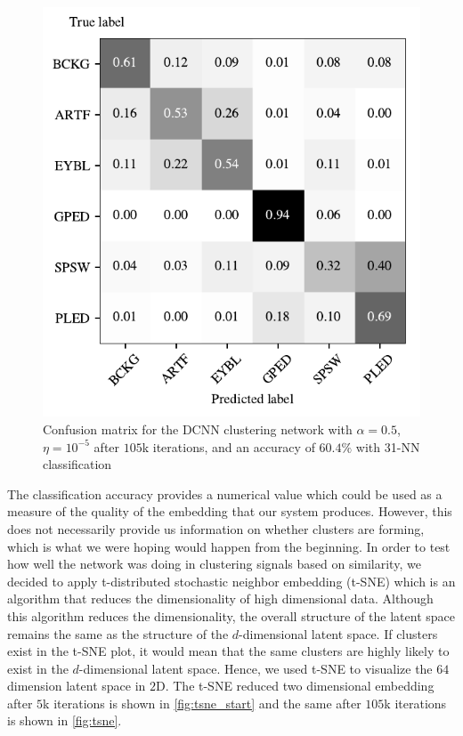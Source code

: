 \begin{figure}[!ht]
	\centering
	\includegraphics[width=0.7\linewidth]{pictures/conf_mat_exp.pdf}
	\caption[Confusion matrix for the DCNN clustering network]{Confusion matrix for the DCNN clustering network with $\alpha = 0.5$, $\eta = 10^{-5}$ after $105$k iterations, and an accuracy of $60.4\%$ with 31-NN classification}\label{fig:dcnnlarge}
\end{figure}

The classification accuracy provides a numerical value which could be used as a measure of the quality of the embedding that our system produces. However, this does not necessarily provide us information on whether clusters are forming, which is what we were hoping would happen from the beginning. In order to test how well the network was doing in clustering signals based on similarity, we decided to apply t-distributed stochastic neighbor embedding  (t-SNE) which is an algorithm that reduces the dimensionality of high dimensional data. Although this algorithm reduces the dimensionality, the overall structure of the latent space remains the same as the structure of the $d$-dimensional latent space. If clusters exist in the t-SNE plot, it would mean that the same clusters are highly likely to exist in the $d$-dimensional latent space. Hence, we used t-SNE to visualize the $64$ dimension latent space in $2$D. The t-SNE reduced two dimensional embedding after $5$k iterations is shown in \cref{fig:tsne_start} and the same after $105$k iterations is shown in \cref{fig:tsne}. 

